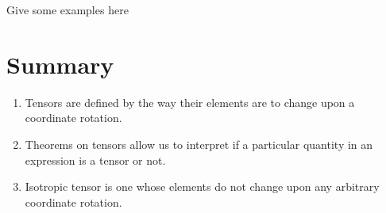 Give some examples here

\section{Summary}

\begin{enumerate}
\item Tensors are defined by the way their elements are to change upon a coordinate rotation.
\item Theorems on tensors allow us to interpret if a particular quantity in an expression is a tensor or not.
\item Isotropic tensor is one whose elements do not change upon any arbitrary coordinate rotation. 
\end{enumerate}

